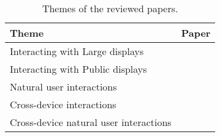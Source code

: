 \begin{table}[h!]
\centering
\begin{tabular}{@{}lp{3cm}@{}}
\toprule
Theme & Paper \\\midrule[2pt] 
Interacting with Large displays      & \cite{Weiser:1991} \cite{Hinrichs:2013:IPD:2478559.2478965} \cite{Wellner:1993} \cite{Buxton:2000} \\\midrule%
Interacting with Public displays      & \cite{Brignull:2003} \cite{Ojala:2012:MIP:2225044.2225065} \cite{Schieck:2012:AEM:2393132.2393141} \cite{Boring:2013} \cite{Jacucci:2010} \cite{Ren:2013} \cite{Lucero:2012} \cite{Valkanova:2014} \cite{Huang:2003} \\\midrule%
Natural user interactions      & \cite{Keefe:2001} \cite{Vogel:2005} \cite{Aigner:2012} \cite{Karam:2005} \cite{Walter:2014} \cite{Wigdor:2011} \cite{Wilson:2010} \cite{KinectFiction:2010} \cite{KinnectPower:2012} \\\midrule%
Cross-device interactions      & \cite{Scharf:2013} \cite{Rekimoto:1997} \cite{Hamilton:2014} \cite{Radle:2015} \cite{Schmidt:2012} \cite{Boring:2009} \\\midrule%
Cross-device natural user interactions      & \cite{Marquardt:2011} \cite{Marquardt:2012} \cite{Seifert:2012} \cite{Bragton:2011} \\%
\bottomrule
\end{tabular}
\caption{Themes of the reviewed papers.}
\label{tab:themes}
\end{table}






